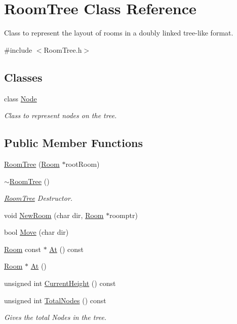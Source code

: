 \hypertarget{classRoomTree}{\section{Room\-Tree Class Reference}
\label{classRoomTree}
}


Class to represent the layout of rooms in a doubly linked tree-\/like format.  




{\ttfamily \#include $<$Room\-Tree.\-h$>$}

\subsection*{Classes}
\begin{DoxyCompactItemize}
\item 
class \hyperlink{classRoomTree_1_1Node}{Node}
\begin{DoxyCompactList}\small\item\em Class to represent nodes on the tree. \end{DoxyCompactList}\end{DoxyCompactItemize}
\subsection*{Public Member Functions}
\begin{DoxyCompactItemize}
\item 
\hyperlink{classRoomTree_a2ea4adb06c7a1913d21ebaa6548a0167}{Room\-Tree} (\hyperlink{classRoom}{Room} $\ast$root\-Room)
\item 
\hyperlink{classRoomTree_a1bd0bf9ba15d59e29127f762a3cdf036}{$\sim$\-Room\-Tree} ()
\begin{DoxyCompactList}\small\item\em \hyperlink{classRoomTree}{Room\-Tree} Destructor. \end{DoxyCompactList}\item 
void \hyperlink{classRoomTree_a8c2d8a4f8e8d33c3bffa8ecbb1124a60}{New\-Room} (char dir, \hyperlink{classRoom}{Room} $\ast$roomptr)
\item 
bool \hyperlink{classRoomTree_a537e9612b7ff7b399259589c2f0f8419}{Move} (char dir)
\item 
\hyperlink{classRoom}{Room} const $\ast$ \hyperlink{classRoomTree_ae51faf0e1636e9825171c447565b5d2e}{At} () const 
\item 
\hyperlink{classRoom}{Room} $\ast$ \hyperlink{classRoomTree_ae0864011915cbaa34cd4bc53d0bf512b}{At} ()
\item 
unsigned int \hyperlink{classRoomTree_a326bc29bec9bb483ddb49dd0ee2a70b7}{Current\-Height} () const 
\item 
unsigned int \hyperlink{classRoomTree_aa425bed3ba13167f3a8b39fac3d6ac87}{Total\-Nodes} () const 
\begin{DoxyCompactList}\small\item\em Gives the total Nodes in the tree. \end{DoxyCompactList}\end{DoxyCompactItemize}
